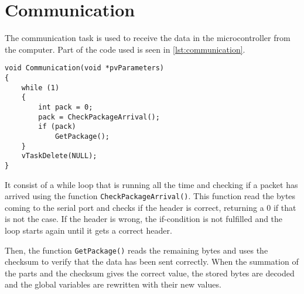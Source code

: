 \section{Communication}
The communication task is used to receive the data in the microcontroller from the computer. Part of the code used is seen in \autoref{lst:communication}.

\begin{lstlisting}[style=customcpp,
                caption={Code for the comunication task.}, 
                label=lst:communication]
void Communication(void *pvParameters)
{
    while (1)
    {
        int pack = 0;
        pack = CheckPackageArrival();
        if (pack)
            GetPackage();
    }
    vTaskDelete(NULL);
}
\end{lstlisting}

It consist of a while loop that is running all the time and checking if a packet has arrived using the function \lstinline[style=customcppinline]{CheckPackageArrival()}. This function read the bytes coming to the serial port and checks if the header is correct, returning a 0 if that is not the case. If the header is wrong, the if-condition is not fulfilled and the loop starts again until it gets a correct header.

Then, the function \lstinline[style=customcppinline]{GetPackage()} reads the remaining bytes and uses the checksum to verify that the data has been sent correctly. When the summation of the parts and the checksum gives the correct value, the stored bytes are decoded and the global variables are rewritten with their new values.